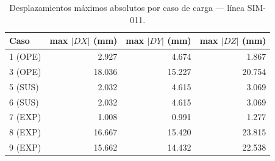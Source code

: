 \begin{table}[htbp]
  \centering
  \small
  \caption{Desplazamientos máximos absolutos por caso de carga — línea SIM-011.}
  \label{tab:desplaz-max}
  \begin{tabular}{lrrr}
    \toprule
    Caso & max $|DX|$ (\si{mm}) & max $|DY|$ (\si{mm}) & max $|DZ|$ (\si{mm}) \\
    \midrule
    1 (OPE) & 2.927 & 4.674 & 1.867 \\
    3 (OPE) & 18.036 & 15.227 & 20.754 \\
    5 (SUS) & 2.032 & 4.615 & 3.069 \\
    6 (SUS) & 2.032 & 4.615 & 3.069 \\
    7 (EXP) & 1.008 & 0.991 & 1.277 \\
    8 (EXP) & 16.667 & 15.420 & 23.815 \\
    9 (EXP) & 15.662 & 14.432 & 22.538 \\
    \bottomrule
  \end{tabular}
\end{table}
